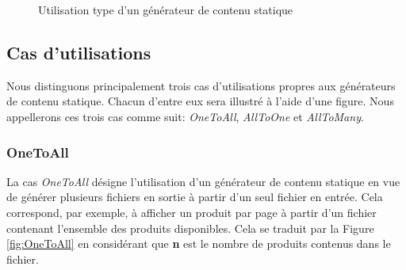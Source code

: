 		\begin{figure}[h]
			\begin{center}
			\caption{Utilisation type d'un générateur de contenu statique}
			\label{fig:use_of_generator}
			\end{center}
		\end{figure}

	\subsection{Cas d'utilisations}
	
		Nous distinguons principalement trois cas d'utilisations propres aux générateurs de contenu statique. Chacun d'entre eux sera illustré à l'aide d'une figure. Nous appellerons ces trois cas comme suit: \textit{OneToAll}, \textit{AllToOne} et \textit{AllToMany}.\\
		
		\subsubsection*{OneToAll}
		
			La cas \textit{OneToAll} désigne l'utilisation d'un générateur de contenu statique en vue de générer plusieurs fichiers en sortie à partir d'un seul fichier en entrée. Cela correspond, par exemple, à afficher un produit par page à partir d'un fichier contenant l'ensemble des produits disponibles. Cela se traduit par la Figure \ref{fig:OneToAll} en considérant que \textbf{n} est le nombre de produits contenus dans le fichier.
			
